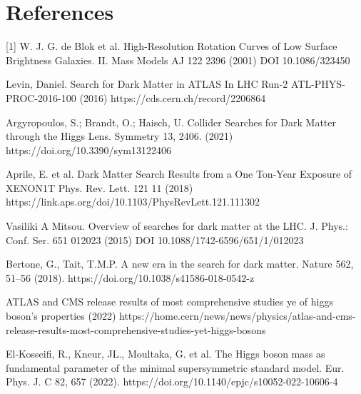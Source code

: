 \documentclass[]{article}
\begin{document}
\section*{References}

[1] W. J. G. de Blok et al. High-Resolution Rotation Curves of Low Surface Brightness
Galaxies. II. Mass Models AJ 122 2396 (2001) DOI 10.1086/323450

\par
\noindent
[2] Levin, Daniel. Search for Dark Matter in ATLAS In LHC Run-2
ATL-PHYS-PROC-2016-100 (2016) https://cds.cern.ch/record/2206864




\par
\noindent
[3] Argyropoulos, S.; Brandt, O.; Haisch, U. Collider Searches for Dark Matter 
through the Higgs Lens. Symmetry 13, 2406. (2021)
https://doi.org/10.3390/sym13122406 \par
\noindent
[4] Aprile, E. et al. Dark Matter Search Results from a One Ton-Year Exposure of XENON1T
Phys. Rev. Lett. 121 11 (2018) https://link.aps.org/doi/10.1103/PhysRevLett.121.111302


\par
\noindent
[5] Vasiliki A Mitsou. Overview of searches for dark matter at the LHC. J. Phys.: Conf. Ser. 651 012023 (2015) 
DOI 10.1088/1742-6596/651/1/012023

\par
\noindent
[6] Bertone, G., Tait, T.M.P. A new era in the search for dark matter. 
Nature 562, 51–56 (2018). https://doi.org/10.1038/s41586-018-0542-z
\par
\noindent
[7] ATLAS and CMS release results of most comprehensive studies ye of higgs boson's
properties (2022)
https://home.cern/news/news/physics/atlas-and-cms-release-results-most-comprehensive-studies-yet-higgs-bosons
\par
\noindent
[8] El-Kosseifi, R., Kneur, JL., Moultaka, G. et al. The Higgs boson mass as 
fundamental parameter of the minimal supersymmetric standard model. Eur. Phys. 
J. C 82, 657 (2022). https://doi.org/10.1140/epjc/s10052-022-10606-4 
\end{document}
